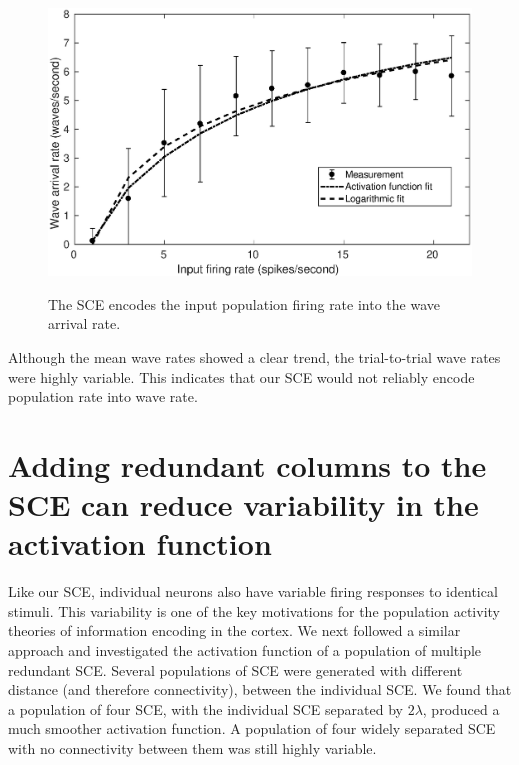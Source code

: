 \begin{figure}[!htb]
 \centering
 \caption{The SCE encodes the input population firing rate into the wave arrival rate. }
 \includegraphics[width=\textwidth]{fig/SCE_2x2_FRE}
 \label{fig:sce_activation_function}
\end{figure}

Although the mean wave rates showed a clear trend, the trial-to-trial wave rates were highly variable. 
This indicates that our SCE would not reliably encode population rate into wave rate.

\FloatBarrier

\section{Adding redundant columns to the SCE can reduce variability in the activation function}
Like our SCE, individual neurons also have variable firing responses to identical stimuli.
This variability is one of the key motivations for the population activity theories of information encoding in the cortex.
We next followed a similar approach and investigated the activation function of a population of multiple redundant SCE.
Several populations of SCE were generated with different distance (and therefore connectivity), between the individual SCE.
We found that a population of four SCE, with the individual SCE separated by $2\lambda$, produced a much smoother activation function.
A population of four widely separated SCE with no connectivity between them was still highly variable.


